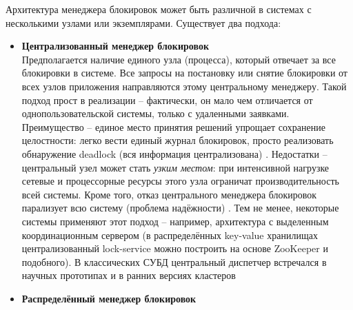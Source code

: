  Архитектура менеджера блокировок может быть различной в системах с несколькими узлами или экземплярами. Существует два подхода: 
 \begin{itemize}
    \item \textbf{Централизованный менеджер блокировок} ~\\
   Предполагается наличие единого узла (процесса), который отвечает за все блокировки в системе. Все запросы на постановку или снятие блокировки от всех узлов приложения направляются этому центральному менеджеру. Такой подход прост в реализации – фактически, он мало чем отличается от однопользовательской системы, только с удаленными заявками. Преимущество – единое место принятия решений упрощает сохранение целостности: легко вести единый журнал блокировок, просто реализовать обнаружение deadlock (вся информация централизована) \autocite{Silberschatz}. Недостатки – центральный узел может стать \textit{узким местом}: при интенсивной нагрузке сетевые и процессорные ресурсы этого узла ограничат производительность всей системы. Кроме того, отказ центрального менеджера блокировок парализует всю систему (проблема надёжности) \autocite{Silberschatz}. Тем не менее, некоторые системы применяют этот подход – например, архитектура с выделенным координационным сервером (в распределённых key-value хранилищах централизованный lock-service можно построить на основе ZooKeeper и подобного). В классических СУБД центральный диспетчер встречался в научных прототипах и в ранних версиях кластеров
    \item \textbf{Распределённый менеджер блокировок} ~\\

\end{itemize}
